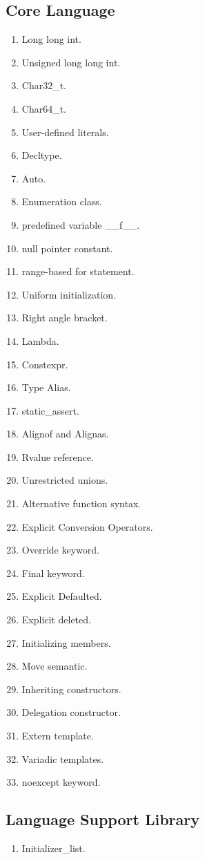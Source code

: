\documentclass[11pt]{report}
\begin{document}
\subsection{Core Language}
\label{sub-section: Core language}
\begin{enumerate}
\item Long long int.
\item Unsigned long long int.
\item Char32\_t.
\item Char64\_t.
\item User-defined literals.
\item Decltype.
\item Auto.
\item Enumeration class.
\item predefined variable \_\_f\_\_.
\item null pointer constant.
\item range-based for statement.
\item Uniform initialization.
\item Right angle bracket.
\item Lambda.
\item Constexpr.
\item Type Alias.
\item static\_assert.
\item Alignof and Alignas.
\item Rvalue reference.
\item Unrestricted unions.
\item Alternative function syntax.
\item Explicit Conversion Operators.
\item Override keyword.
\item Final keyword.
\item Explicit Defaulted.
\item Explicit deleted.
\item Initializing  members.
\item Move semantic.
\item Inheriting constructors.
\item Delegation constructor.
\item Extern template.
\item Variadic templates.
\item noexcept keyword.
\end{enumerate}


\subsection{Language Support Library }
\label{Language support library }
\begin{enumerate}
\item Initializer\_list.
\end{enumerate}
\end{document}
